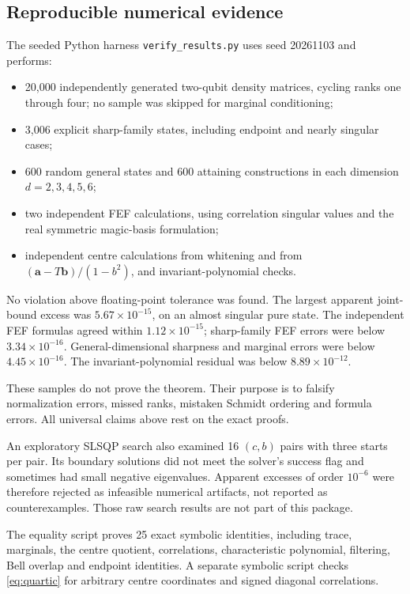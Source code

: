 \subsection{Reproducible numerical evidence}
The seeded Python harness \texttt{verify\_results.py} uses seed 20261103 and performs:
\begin{itemize}
\item 20,000 independently generated two-qubit density matrices, cycling ranks one through four; no sample was skipped for marginal conditioning;
\item 3,006 explicit sharp-family states, including endpoint and nearly singular cases;
\item 600 random general states and 600 attaining constructions in each dimension $d=2,3,4,5,6$;
\item two independent FEF calculations, using correlation singular values and the real symmetric magic-basis formulation;
\item independent centre calculations from whitening and from $(\bm a-T\bm b)/(1-b^2)$, and invariant-polynomial checks.
\end{itemize}
No violation above floating-point tolerance was found. The largest apparent joint-bound excess was $5.67\times10^{-15}$, on an almost singular pure state. The independent FEF formulas agreed within $1.12\times10^{-15}$; sharp-family FEF errors were below $3.34\times10^{-16}$. General-dimensional sharpness and marginal errors were below $4.45\times10^{-16}$. The invariant-polynomial residual was below $8.89\times10^{-12}$.

These samples do not prove the theorem. Their purpose is to falsify normalization errors, missed ranks, mistaken Schmidt ordering and formula errors. All universal claims above rest on the exact proofs.

An exploratory SLSQP search also examined 16 $(c,b)$ pairs with three starts per pair. Its boundary solutions did not meet the solver's success flag and sometimes had small negative eigenvalues. Apparent excesses of order $10^{-6}$ were therefore rejected as infeasible numerical artifacts, not reported as counterexamples. Those raw search results are not part of this package.

The equality script proves 25 exact symbolic identities, including trace, marginals, the centre quotient, correlations, characteristic polynomial, filtering, Bell overlap and endpoint identities. A separate symbolic script checks \eqref{eq:quartic} for arbitrary centre coordinates and signed diagonal correlations.

